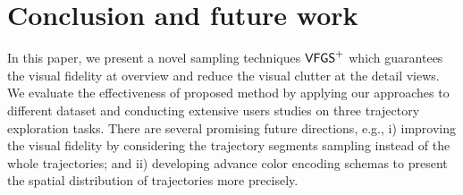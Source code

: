 \section{Conclusion and future work}\label{sec:con}




In this paper, we present a novel sampling techniques $\mathsf{VFGS}^{+}$ which guarantees the visual fidelity at overview and reduce the visual clutter at the detail views.
We evaluate the effectiveness of proposed method by applying our approaches to different dataset and conducting extensive users studies on three trajectory exploration tasks.
There are several promising future directions, e.g., i) improving the visual fidelity by considering the trajectory segments sampling instead of the whole trajectories;
and ii) developing advance color encoding schemas to present the spatial distribution of trajectories more precisely.



